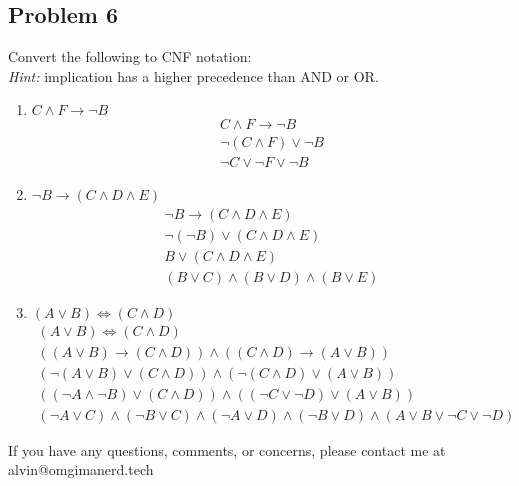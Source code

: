 \documentclass{math}
\begin{document}
\subsection*{Problem 6}
Convert the following to CNF notation: \\
\textit{Hint:} implication has a higher precedence than AND or OR.
\begin{enumerate}
  \item \( C\wedge F\to\neg B \)
  \begin{gather*}
    C\wedge F\to\neg B \\
    \neg(C\wedge F)\vee\neg B \\
    \neg C\vee\neg F\vee\neg B
  \end{gather*}
  \item \( \neg B\to(C\wedge D\wedge E) \)
  \begin{gather*}
    \neg B\to(C\wedge D\wedge E) \\
    \neg(\neg B)\vee(C\wedge D\wedge E) \\
    B\vee(C\wedge D\wedge E) \\
    (B\vee C)\wedge(B\vee D)\wedge(B\vee E)
  \end{gather*}
  \item \( (A\vee B)\Leftrightarrow(C\wedge D) \)
  \begin{gather*}
    (A\vee B)\Leftrightarrow(C\wedge D) \\
    ((A\vee B)\to(C\wedge D))\wedge((C\wedge D)\to(A\vee B)) \\
    (\neg(A\vee B)\vee(C\wedge D))\wedge(\neg(C\wedge D)\vee(A\vee B)) \\
    ((\neg A\wedge\neg B)\vee(C\wedge D))\wedge
      ((\neg C\vee\neg D)\vee(A\vee B)) \\
    (\neg A\vee C)\wedge(\neg B\vee C)\wedge(\neg A\vee D)\wedge(\neg B\vee D)
      \wedge(A\vee B\vee\neg C\vee\neg D)
  \end{gather*}
\end{enumerate}

\begin{center}
  If you have any questions, comments, or concerns, please contact me at
  alvin@omgimanerd.tech
\end{center}
\end{document}
